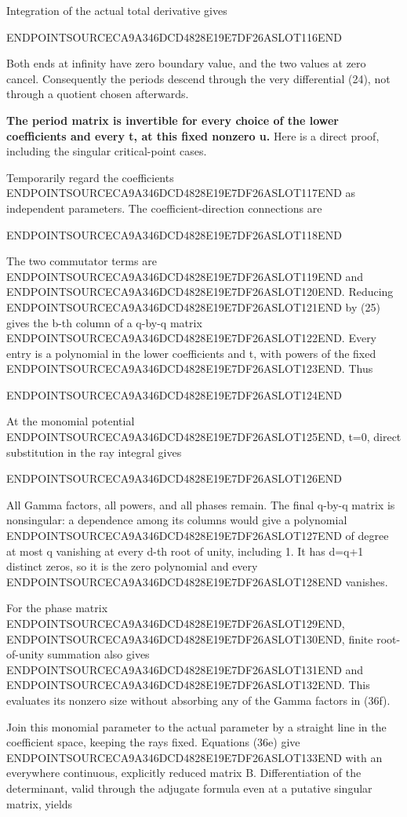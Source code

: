 Integration of the actual total derivative gives

ENDPOINTSOURCECA9A346DCD4828E19E7DF26ASLOT116END

Both ends at infinity have zero boundary value, and the two values at zero cancel. Consequently the periods descend through the very differential (24), not through a quotient chosen afterwards.

\textbf{The period matrix is invertible for every choice of the lower coefficients and every t, at this fixed nonzero u.} Here is a direct proof, including the singular critical-point cases.

Temporarily regard the coefficients ENDPOINTSOURCECA9A346DCD4828E19E7DF26ASLOT117END as independent parameters. The coefficient-direction connections are

ENDPOINTSOURCECA9A346DCD4828E19E7DF26ASLOT118END

The two commutator terms are ENDPOINTSOURCECA9A346DCD4828E19E7DF26ASLOT119END and ENDPOINTSOURCECA9A346DCD4828E19E7DF26ASLOT120END. Reducing ENDPOINTSOURCECA9A346DCD4828E19E7DF26ASLOT121END by (25) gives the b-th column of a q-by-q matrix ENDPOINTSOURCECA9A346DCD4828E19E7DF26ASLOT122END. Every entry is a polynomial in the lower coefficients and t, with powers of the fixed ENDPOINTSOURCECA9A346DCD4828E19E7DF26ASLOT123END. Thus

ENDPOINTSOURCECA9A346DCD4828E19E7DF26ASLOT124END

At the monomial potential ENDPOINTSOURCECA9A346DCD4828E19E7DF26ASLOT125END, t=0, direct substitution in the ray integral gives

ENDPOINTSOURCECA9A346DCD4828E19E7DF26ASLOT126END

All Gamma factors, all powers, and all phases remain. The final q-by-q matrix is nonsingular: a dependence among its columns would give a polynomial ENDPOINTSOURCECA9A346DCD4828E19E7DF26ASLOT127END of degree at most q vanishing at every d-th root of unity, including 1. It has d=q+1 distinct zeros, so it is the zero polynomial and every ENDPOINTSOURCECA9A346DCD4828E19E7DF26ASLOT128END vanishes.

For the phase matrix ENDPOINTSOURCECA9A346DCD4828E19E7DF26ASLOT129END, ENDPOINTSOURCECA9A346DCD4828E19E7DF26ASLOT130END, finite root-of-unity summation also gives ENDPOINTSOURCECA9A346DCD4828E19E7DF26ASLOT131END and ENDPOINTSOURCECA9A346DCD4828E19E7DF26ASLOT132END. This evaluates its nonzero size without absorbing any of the Gamma factors in (36f).

Join this monomial parameter to the actual parameter by a straight line in the coefficient space, keeping the rays fixed. Equations (36e) give ENDPOINTSOURCECA9A346DCD4828E19E7DF26ASLOT133END with an everywhere continuous, explicitly reduced matrix B. Differentiation of the determinant, valid through the adjugate formula even at a putative singular matrix, yields

